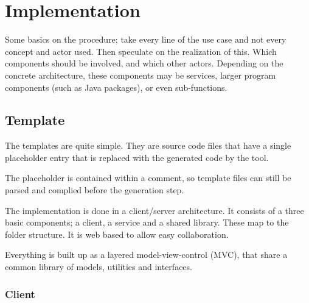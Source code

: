 \chapter{Implementation}
Some basics on the procedure; take every line of the use case and not every concept and actor used. Then speculate on the realization of this. Which components should be involved, and which other actors. Depending on the concrete architecture, these components may be services, larger program components (such as Java packages), or even sub-functions.
\section{Template}
The templates are quite simple. They are source code files that have a single placeholder entry that is replaced with the generated code by the tool.

The placeholder is contained within a comment, so template files can still be parsed and complied before the generation step.


The implementation is done in a client/server architecture. It consists of a three basic components; a client, a service and a shared library. These map to the folder structure. It is web based to allow easy collaboration.


Everything is built up as a layered model-view-control (MVC), that share a common library of models, utilities and interfaces.


\subsection{Client}

